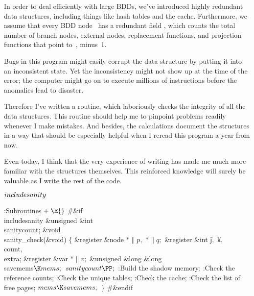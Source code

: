 In order to deal efficiently with large BDDs, we've introduced highly
redundant data structures, including things like hash tables and the cache.
Furthermore, we assume that every BDD node~ has a redundant field
, which counts the total number of branch nodes, external
nodes,
replacement functions, and projection functions that point to~,
minus~1.

Bugs in this program might easily corrupt the data structure by putting it
into an inconsistent state. Yet the inconsistency might not show up at the
time of the error; the computer might go on to execute millions of
instructions before the anomalies lead to disaster.

Therefore I've written a  routine, which laboriously
checks the
integrity of all the data structures. This routine should help me to pinpoint
problems readily whenever I make mistakes. And besides, the 
calculations document the structures in a way that should be especially
helpful when I reread this program a year from now.

Even today, I think that the very experience of writing 
has
made me much more familiar with the structures themselves. This reinforced
knowledge will surely be valuable as I write the rest of the code.

\Y\B\4\D$\\{includesanity}$ \5
\par
\Y\B\4:Subroutines\X${}\mathrel+\E{}$\6
\8\#\&{if} \\{includesanity}\6
\&{unsigned} \&{int} \\{sanitycount};\7
\&{void} \\{sanity\_check}(\&{void})\1\1\2\2\6
${}\{{}$\1\6
\&{register} \&{node} ${}{*}\|p,{}$ ${}{*}\|q;{}$\6
\&{register} \&{int} \|j${},{}$ \|k${},{}$ \\{count}${},{}$ \\{extra};\6
\&{register} \&{var} ${}{*}\|v;{}$\6
\&{unsigned} \&{long} \&{long} \\{savemems}${}\K\\{mems};{}$\7
${}\\{sanitycount}\PP;{}$\6
:Build the shadow memory\X;\6
:Check the reference counts\X;\6
:Check the unique tables\X;\6
:Check the cache\X;\6
:Check the list of free pages\X;\6
${}\\{mems}\K\\{savemems};{}$\6
\4${}\}{}$\2\6
\8\#\&{endif}\par
\fi

